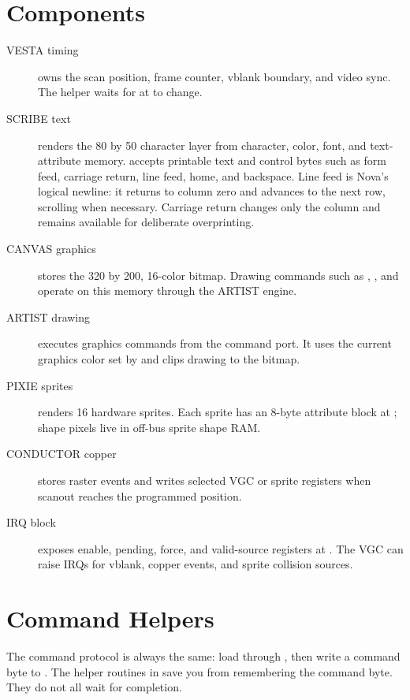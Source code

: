 \section{Components}

\begin{description}
\item[VESTA timing] owns the scan position, frame counter, vblank boundary, and
video sync. The  helper waits for  at
 to change.
\item[SCRIBE text] renders the 80 by 50 character layer from character, color,
font, and text-attribute memory.  accepts printable text
and control bytes such as form feed, carriage return, line feed, home, and
backspace. Line feed is Nova's logical newline: it returns to column zero and
advances to the next row, scrolling when necessary. Carriage return changes
only the column and remains available for deliberate overprinting.
\item[CANVAS graphics] stores the 320 by 200, 16-color bitmap. Drawing commands
such as , , and 
operate on this memory through the ARTIST engine.
\item[ARTIST drawing] executes graphics commands from the command port. It uses
the current graphics color set by  and clips drawing to the
bitmap.
\item[PIXIE sprites] renders 16 hardware sprites. Each sprite has an 8-byte
attribute block at ; shape pixels live in off-bus sprite
shape RAM.
\item[CONDUCTOR copper] stores raster events and writes selected VGC or sprite
registers when scanout reaches the programmed position.
\item[IRQ block] exposes enable, pending, force, and valid-source registers at
. The VGC can raise IRQs for vblank, copper events, and
sprite collision sources.
\end{description}

\section{Command Helpers}

The command protocol is always the same: load  through
, then write a command byte to . The
helper routines in  save you from remembering the command byte.
They do not all wait for completion.

